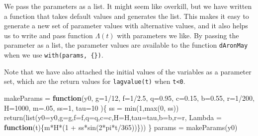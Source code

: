 \documentclass[
]{book}
\newenvironment{Shaded}{\begin{snugshade}}{\end{snugshade}}
\newcommand{\AttributeTok}[1]{\textcolor[rgb]{0.77,0.63,0.00}{#1}}
\newcommand{\ControlFlowTok}[1]{\textcolor[rgb]{0.13,0.29,0.53}{\textbf{#1}}}
\newcommand{\DecValTok}[1]{\textcolor[rgb]{0.00,0.00,0.81}{#1}}
\newcommand{\FloatTok}[1]{\textcolor[rgb]{0.00,0.00,0.81}{#1}}
\newcommand{\FunctionTok}[1]{\textcolor[rgb]{0.00,0.00,0.00}{#1}}
\newcommand{\NormalTok}[1]{#1}
\newcommand{\OtherTok}[1]{\textcolor[rgb]{0.56,0.35,0.01}{#1}}
\newcommand{\SpecialCharTok}[1]{\textcolor[rgb]{0.00,0.00,0.00}{#1}}
\begin{document}
We pass the parameters as a list. It might seem like overkill, but we have written a function that takes default values and generates the list. This makes it easy to generate a new set of parameter values with alternative values, and it also helps us to write and pass function \(\Lambda(t)\) with parameters we like. By passing the parameter as a list, the parameter values are available to the function \texttt{dAronMay} when we use \texttt{with(params,\ \{\})}.

Note that we have also attached the initial values of the variables as a parameter set, which are the return values for \texttt{lagvalue(t)} when \texttt{t\textless{}0}.

\begin{Shaded}
\begin{Highlighting}[]
\NormalTok{makeParams }\OtherTok{=} \ControlFlowTok{function}\NormalTok{(y0, }
                      \AttributeTok{g=}\DecValTok{1}\SpecialCharTok{/}\DecValTok{12}\NormalTok{, }\AttributeTok{f=}\DecValTok{1}\SpecialCharTok{/}\FloatTok{2.5}\NormalTok{, }\AttributeTok{q=}\FloatTok{0.95}\NormalTok{,  }
                      \AttributeTok{c=}\FloatTok{0.15}\NormalTok{,}
                      \AttributeTok{b=}\FloatTok{0.55}\NormalTok{, }\AttributeTok{r=}\DecValTok{1}\SpecialCharTok{/}\DecValTok{200}\NormalTok{, }\AttributeTok{H=}\DecValTok{1000}\NormalTok{,  }
                      \AttributeTok{m=}\NormalTok{.}\DecValTok{05}\NormalTok{, }\AttributeTok{ss=}\DecValTok{1}\NormalTok{,  }
                      \AttributeTok{tau=}\DecValTok{10}  
\NormalTok{                      )\{}
\NormalTok{  ss }\OtherTok{=} \FunctionTok{min}\NormalTok{(}\DecValTok{1}\NormalTok{,}\FunctionTok{max}\NormalTok{(}\DecValTok{0}\NormalTok{, ss))}
\FunctionTok{return}\NormalTok{(}\FunctionTok{list}\NormalTok{(}\AttributeTok{y0=}\NormalTok{y0,}\AttributeTok{g=}\NormalTok{g,}\AttributeTok{f=}\NormalTok{f,}\AttributeTok{q=}\NormalTok{q,}\AttributeTok{c=}\NormalTok{c,}\AttributeTok{H=}\NormalTok{H,}\AttributeTok{tau=}\NormalTok{tau,}\AttributeTok{b=}\NormalTok{b,}\AttributeTok{r=}\NormalTok{r,}
  \AttributeTok{Lambda =} \ControlFlowTok{function}\NormalTok{(t)\{m}\SpecialCharTok{*}\NormalTok{H}\SpecialCharTok{*}\NormalTok{(}\DecValTok{1} \SpecialCharTok{+}\NormalTok{ ss}\SpecialCharTok{*}\FunctionTok{sin}\NormalTok{(}\DecValTok{2}\SpecialCharTok{*}\NormalTok{pi}\SpecialCharTok{*}\NormalTok{t}\SpecialCharTok{/}\DecValTok{365}\NormalTok{))\})) }
\NormalTok{\} }
\NormalTok{params }\OtherTok{=} \FunctionTok{makeParams}\NormalTok{(y0)}
\end{Highlighting}
\end{Shaded}
\end{document}

